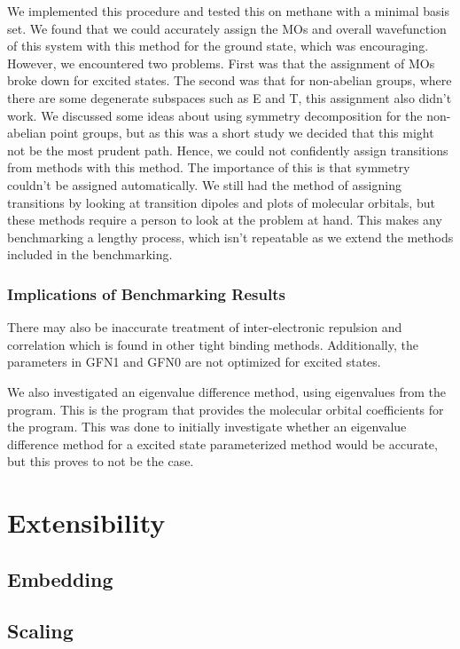 We implemented this procedure and tested this on methane with a minimal basis set.
We found that we could accurately assign the MOs and overall wavefunction of this
system with this method for the ground state, which was encouraging.
However, we encountered two problems. First was that the assignment of MOs broke
down for excited states. The second was that for non-abelian groups, where there
are some degenerate subspaces such as E and T, this assignment also didn't work.
We discussed some ideas about using symmetry decomposition for the non-abelian 
point groups, but as this was a short study we decided that this might not be the
most prudent path. Hence, we could not confidently assign transitions from \dscf
methods with this method. The importance of this is that symmetry couldn't be 
assigned automatically. We still had the method of assigning transitions by looking
at transition dipoles and plots of molecular orbitals, but these methods require
a person to look at the problem at hand. This makes any benchmarking a lengthy 
process, which isn't repeatable as we extend the methods included in the benchmarking.

\subsubsection{Implications of Benchmarking Results}
\label{subsubsec:imp_of_benchmarking}
There may also be inaccurate treatment of inter-electronic repulsion and correlation 
which is found in other tight binding methods. Additionally, the parameters in 
GFN1 and GFN0 are not optimized for excited states.

We also investigated an eigenvalue difference method, using eigenvalues from the
 program. This is the program that provides the molecular orbital
coefficients for the  program. This was done to initially 
investigate whether an eigenvalue difference method for a excited state parameterized 
method would be accurate, but this proves to not be the case.

\section{Extensibility}
\label{sec:dscf_problems}

\subsection{Embedding}
\label{subsec:dscf_embedding}

\subsection{Scaling}
\label{subsec:dscf_scaling}